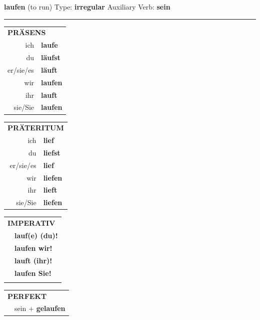 \documentclass[10pt,a4paper]{revtex4-2}
\begin{document}
\begin{verbbox}
    {\Large \bf laufen} (to run) \hfill Type: \textbf{irregular} \hfill Auxiliary Verb: \textbf{sein} 
    
     \vspace{5pt}

    \hrule
    
    \vspace{5pt}

  \begin{tabular}{rl}
     \multicolumn{2}{l}{\textbf{PRÄSENS} }\\
    ich & \textbf{laufe}\\
    du & \textbf{läufst}\\
    er/sie/es & \textbf{läuft}\\
    wir & \textbf{laufen}\\
    ihr & \textbf{lauft}\\
    sie/Sie & \textbf{laufen}\\
  \end{tabular}
  \hfill
     \begin{tabular}{rl}
    \multicolumn{2}{l}{\textbf{PRÄTERITUM} }\\
    ich & \textbf{lief}\\
    du & \textbf{liefst}\\
    er/sie/es & \textbf{lief}\\
    wir & \textbf{liefen}\\
    ihr & \textbf{lieft}\\
    sie/Sie & \textbf{liefen}\\
  \end{tabular}
  \hfill
  \begin{tabular}{rl}
     \multicolumn{2}{l}{\textbf{IMPERATIV} }\\
   & \textbf{lauf(e) (du)!}\\
   & \textbf{laufen wir!}\\
   & \textbf{lauft (ihr)!}\\
   & \textbf{laufen Sie!}\\
   & \vspace{10pt}
  \end{tabular}

    \vspace{10pt}

 \begin{tabular}{rl}
     \multicolumn{2}{l}{\textbf{PERFEKT}}\\
  &  sein + \textbf{gelaufen}\\
  \end{tabular}
\hfill
   \begin{tabular}{rl}
   

\end{tabular}
\end{verbbox}
\end{document}
